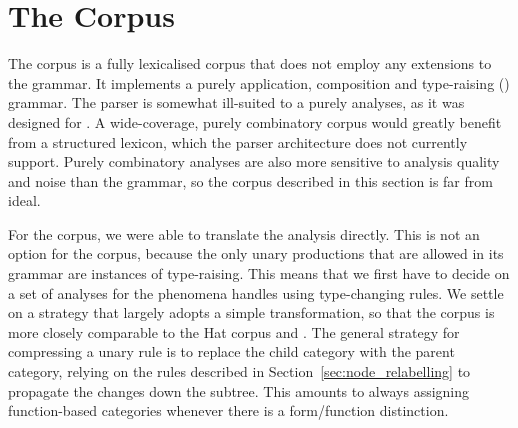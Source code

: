\begin{center}
\end{center}


\section{The \nounary Corpus}
\label{sec:nounary_corpus}

The \nounary corpus is a fully lexicalised corpus that does not employ any
extensions to the grammar. It implements a purely application, composition and
type-raising (\act) grammar. The \candc parser is somewhat ill-suited to a
purely \act analyses, as it was designed for \ccgbank. A wide-coverage, purely
combinatory corpus would greatly benefit from a structured lexicon, which the
\candc parser architecture does not currently support. Purely combinatory
analyses are also more sensitive to analysis quality and noise than the \ccgbank
grammar, so the corpus described in this section is far from ideal.

For the \hatsys corpus, we were able to translate the \ccg analysis directly.
This is not an option for the \nounary corpus, because the only unary
productions that are allowed in its grammar are instances of type-raising. This
means that we first have to decide on a set of analyses for the phenomena
\ccgbank handles using type-changing rules. We settle on a strategy that
largely adopts a simple transformation, so that the corpus is more closely
comparable to the Hat corpus and \ccgbank. The general strategy for compressing
a unary rule is to replace the child category with the parent category, relying
on the rules described in Section~\ref{sec:node_relabelling} to propagate the
changes down the subtree. This amounts to always assigning function-based
categories whenever there is a form/function distinction.


